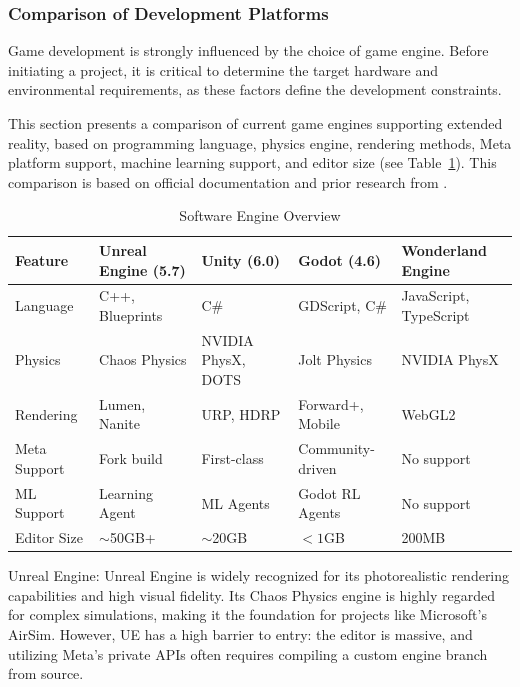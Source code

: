 \subsubsection{Comparison of Development Platforms}

Game development is strongly influenced by the choice of game engine. Before initiating a project, it is critical to determine the target hardware and environmental requirements, as these factors define the development constraints.

This section presents a comparison of current game engines supporting extended reality, based on programming language, physics engine, rendering methods, Meta platform support, machine learning support, and editor size (see Table~\ref{table:xr_engine}). This comparison is based on official documentation and prior research from \parencite{ezhil_comparative_nodate}.

\begin{table}[h]
\centering
\caption{Software Engine Overview}\label{table:xr_engine}
\setlength{\tabcolsep}{6pt} 
\begin{tabularx}{1\textwidth}{l|X|X|X|X}
\hline
Feature & Unreal Engine (5.7) & Unity (6.0) & Godot (4.6) & Wonderland Engine \\
\hline
Language & C++, Blueprints    & C\#        & GDScript, C\# & JavaScript, TypeScript \\
Physics & Chaos Physics      & NVIDIA PhysX, DOTS & Jolt Physics   & NVIDIA PhysX \\
Rendering  & Lumen, Nanite & URP, HDRP    & Forward+, Mobile & WebGL2 \\
Meta Support & Fork build  & First-class & Community-driven & No support \\
ML Support & Learning Agent & ML Agents & Godot RL Agents & No support \\
Editor Size & $\sim$50GB+ & $\sim$20GB & $<1$GB & 200MB \\
\hline
\end{tabularx}

\end{table}

Unreal Engine: Unreal Engine is widely recognized for its photorealistic rendering capabilities and high visual fidelity. Its Chaos Physics engine is highly regarded for complex simulations, making it the foundation for projects like Microsoft's AirSim. However, UE has a high barrier to entry: the editor is massive, and utilizing Meta's private APIs often requires compiling a custom engine branch from source.

